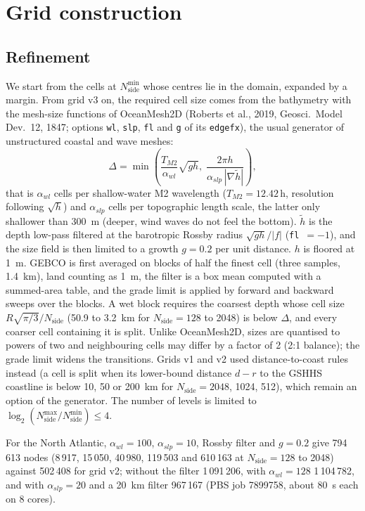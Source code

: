 \documentclass[11pt,a4paper]{article}
\newcommand{\nside}{N_{\mathrm{side}}}
\begin{document}
\section{Grid construction}
\subsection{Refinement}
We start from the cells at $\nside^{\min}$ whose centres lie in the domain,
expanded by a margin. From grid v3 on, the required cell size comes from the
bathymetry with the mesh-size functions of OceanMesh2D
(Roberts et al., 2019, Geosci.\ Model Dev.\ 12, 1847; options \texttt{wl},
\texttt{slp}, \texttt{fl} and \texttt{g} of its \texttt{edgefx}), the usual generator of unstructured coastal
and wave meshes:
\begin{equation}
\Delta = \min\left(\frac{T_{M2}}{\alpha_{wl}}\sqrt{g h},\;
\frac{2\pi h}{\alpha_{slp}\,|\nabla\tilde h|}\right),
\end{equation}
that is $\alpha_{wl}$ cells per shallow-water M2 wavelength ($T_{M2}=12.42$\,h,
resolution following $\sqrt h$) and $\alpha_{slp}$ cells per topographic length
scale, the latter only shallower than \SI{300}{m} (deeper, wind waves do not
feel the bottom). $\tilde h$ is the depth low-pass filtered at the barotropic
Rossby radius $\sqrt{gh}/|f|$ (\texttt{fl}~$=-1$), and the size field is then
limited to a growth $g=0.2$ per unit distance. $h$ is floored at \SI{1}{m}.
GEBCO is first averaged on blocks of half the finest cell (three samples,
\SI{1.4}{km}), land counting as \SI{1}{m}, the filter is a box mean computed
with a summed-area table, and the grade limit is applied by forward and
backward sweeps over the blocks. A wet block requires the coarsest depth whose
cell size $R\sqrt{\pi/3}/\nside$ (50.9 to \SI{3.2}{km} for $\nside=128$ to
2048) is below $\Delta$, and every coarser cell containing it is split. Unlike
OceanMesh2D, sizes are quantised to powers of two and neighbouring cells may
differ by a factor of 2 (2:1 balance); the grade limit widens the
transitions. Grids v1 and v2 used distance-to-coast rules instead (a cell is
split when its lower-bound distance $d-r$ to the GSHHS coastline is below
10, 50 or \SI{200}{km} for $\nside=2048$, 1024, 512), which remain an option
of the generator. The number of levels is limited to
$\log_2(\nside^{\max}/\nside^{\min})\le 4$.

For the North Atlantic, $\alpha_{wl}=100$, $\alpha_{slp}=10$, Rossby filter
and $g=0.2$ give 794\,613 nodes (8\,917, 15\,050, 40\,980, 119\,503 and
610\,163 at $\nside=128$ to 2048) against 502\,408 for grid v2; without the
filter 1\,091\,206, with $\alpha_{wl}=128$ 1\,104\,782, and with
$\alpha_{slp}=20$ and a \SI{20}{km} filter 967\,167 (PBS job 7899758, about
\SI{80}{s} each on 8 cores).
\end{document}
